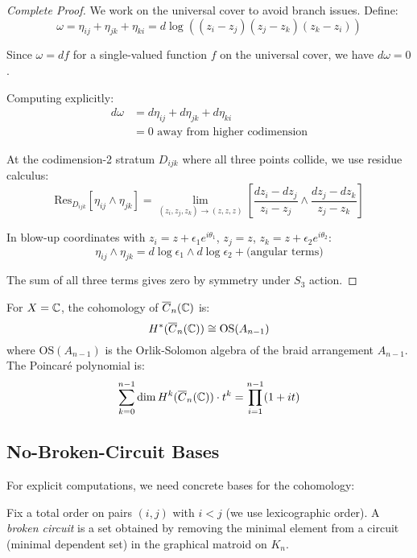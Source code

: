 \begin{proof}[Complete Proof]
We work on the universal cover to avoid branch issues. Define:
$$\omega = \eta_{ij} + \eta_{jk} + \eta_{ki} = d\log((z_i - z_j)(z_j - z_k)(z_k - z_i))$$

Since $\omega = df$ for a single-valued function $f$ on the universal cover, we have $d\omega = 0$.

Computing explicitly:
\begin{align}
d\omega &= d\eta_{ij} + d\eta_{jk} + d\eta_{ki}\\
&= 0 \text{ away from higher codimension}
\end{align}

At the codimension-2 stratum $D_{ijk}$ where all three points collide, we use residue calculus:
$$\text{Res}_{D_{ijk}}[\eta_{ij} \wedge \eta_{jk}] = \lim_{(z_i,z_j,z_k) \to (z,z,z)} \left[\frac{dz_i - dz_j}{z_i - z_j} \wedge \frac{dz_j - dz_k}{z_j - z_k}\right]$$

In blow-up coordinates with $z_i = z + \epsilon_1 e^{i\theta_1}$, $z_j = z$, $z_k = z + \epsilon_2 e^{i\theta_2}$:
$$\eta_{ij} \wedge \eta_{jk} = d\log\epsilon_1 \wedge d\log\epsilon_2 + \text{(angular terms)}$$

The sum of all three terms gives zero by symmetry under $S_3$ action.
\end{proof}
 
\begin{theorem}
For $X = \mathbb{C}$, the cohomology of $\overline{C}_n(\mathbb{C})$ is:
\[
H^*(\overline{C}_n(\mathbb{C})) \cong \text{OS}(A_{n-1})
\]
where $\text{OS}(A_{n-1})$ is the Orlik-Solomon algebra of the braid arrangement $A_{n-1}$. The Poincaré polynomial is:
\[
\sum_{k=0}^{n-1} \dim H^k(\overline{C}_n(\mathbb{C})) \cdot t^k = \prod_{i=1}^{n-1}(1 + it)
\]
\end{theorem}
 
\subsection{No-Broken-Circuit Bases}
 
For explicit computations, we need concrete bases for the cohomology:
 
\begin{definition}
Fix a total order on pairs $(i, j)$ with $i < j$ (we use lexicographic order). A \emph{broken circuit} is a set obtained by removing the minimal element from a circuit (minimal dependent set) in the graphical matroid on $K_n$.
\end{definition}
 
